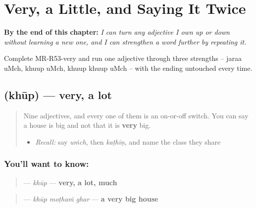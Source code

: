
\chapter{Very, a Little, and Saying It Twice}
\label{ch:mr-degree}

\begin{chapteropening}
\textbf{By the end of this chapter:} \emph{I can turn any adjective I own up or down without learning a new one, and I can strengthen a word further by repeating it.}

Complete MR-R53-very and run one adjective through three strengths -- jaraa uMch, khuup uMch, khuup khuup uMch -- with the ending untouched every time.
\end{chapteropening}

\section[\texorpdfstring{\mr{खूप} (khūp)}{खूप (khūp)}]{ (khūp) — very, a lot}

\label{lesson:MR-C53-khuup}



\begin{quote}
Nine adjectives, and every one of them is an on-or-off switch. You can say a house is big and not that it is \textbf{very} big.

\begin{itemize}
\raggedright
  \item \emph{Recall:} say \emph{uṁch}, then \emph{kaṭhīṇ}, and name the class they share
\end{itemize}
\end{quote}

\subsection*{You'll want to know: }
\begin{quote}
\textbf{} — \emph{khūp} — \textbf{very, a lot, much}
\end{quote}

\begin{quote}
\textbf{  } — \emph{khūp moṭhaṁ ghar} — \textbf{a very big house}
\end{quote}

